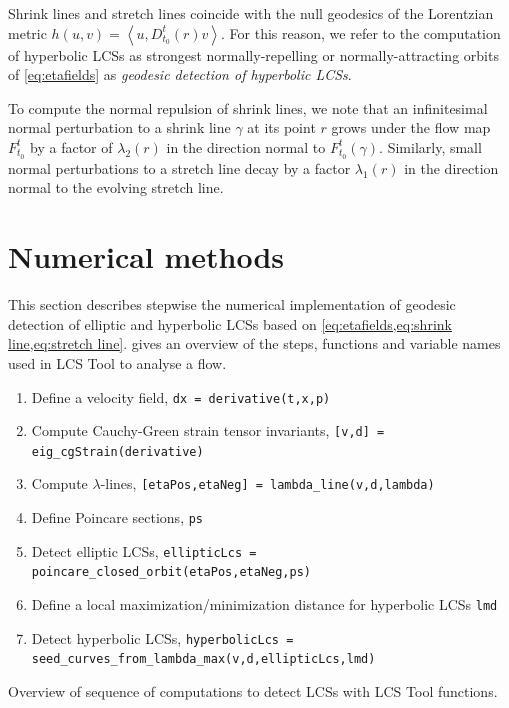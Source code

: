 \documentclass[5p]{elsarticle}
\begin{document}
Shrink lines and stretch lines coincide with the null geodesics of the Lorentzian metric $h(u,v) = \left\langle u,D_{t_0}^t(r) v \right\rangle$. For this reason, we refer to the computation of hyperbolic LCSs as strongest normally-repelling or normally-attracting orbits of \cref{eq:etafields} as \emph{geodesic detection of hyperbolic LCSs}.

To compute the normal repulsion of shrink lines, we note that an infinitesimal
normal perturbation to a shrink line $\gamma$ at its point $r$ grows under the flow map $F_{t_{0}}^{t}$ by a factor of $\lambda_{2}(r)$ in the direction normal to $F_{t_{0}}^{t}(\gamma).$ Similarly, small normal perturbations to a stretch line decay by a factor $\lambda_{1}(r)$ in the direction normal to the evolving stretch line. 

\section{Numerical methods}

This section describes stepwise the numerical implementation of geodesic detection of elliptic and hyperbolic LCSs based on \cref{eq:etafields,eq:shrink line,eq:stretch line}.  gives an overview of the steps, functions and variable names used in LCS Tool to analyse a flow.

\begin{table}
\begin{enumerate}
\item Define a velocity field, \lstinline!dx = derivative(t,x,p)!
\item Compute Cauchy-Green strain tensor invariants, \lstinline![v,d] = eig_cgStrain(derivative)!
\item Compute $\lambda$-lines, \lstinline![etaPos,etaNeg] = lambda_line(v,d,lambda)!
\item Define Poincare sections, \lstinline!ps!
\item Detect elliptic LCSs, \lstinline!ellipticLcs = poincare_closed_orbit(etaPos,etaNeg,ps)!
\item Define a local maximization/minimization distance for hyperbolic LCSs \lstinline!lmd!
\item Detect hyperbolic LCSs, \lstinline!hyperbolicLcs = seed_curves_from_lambda_max(v,d,ellipticLcs,lmd)!
\end{enumerate}
\caption{Overview of sequence of computations to detect LCSs with LCS Tool functions.}
\label{t:LCS Tool overview}
\end{table}
\end{document}
